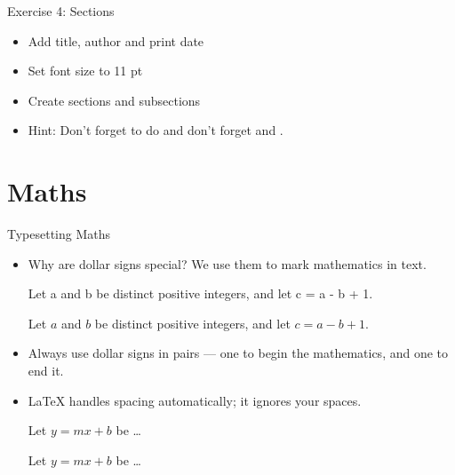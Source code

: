 \documentclass[10pt,times]{beamer}
\begin{document}
\begin{frame}{Exercise 4: Sections}
\begin{itemize}
\item Add title, author and print date
\item Set font size to 11 pt
\item Create sections and subsections
\end{itemize}
\begin{center}
\end{center}

\begin{itemize}
\item Hint: Don't forget to do  and don't forget 
 and 
.
\end{itemize}

\end{frame}


\section{Maths}
\begin{frame}[fragile]{Typesetting Maths}
\begin{itemize}
\item Why are dollar signs \keys{\$} special? We use them to mark mathematics 
in text.\\[1ex]
\begin{exampletwouptiny}
Let a and b be distinct positive
integers, and let c = a - b + 1.

Let $a$ and $b$ be distinct positive
integers, and let $c = a - b + 1$.
\end{exampletwouptiny}
\item Always use dollar signs in pairs --- one to begin the mathematics, and one
to end it.
\item \LaTeX{} handles spacing automatically; it ignores your spaces.
\begin{exampletwouptiny}
Let $y=mx+b$ be \ldots

Let $y = m x + b$ be \ldots
\end{exampletwouptiny}

\end{itemize}
\end{frame}
\end{document}
